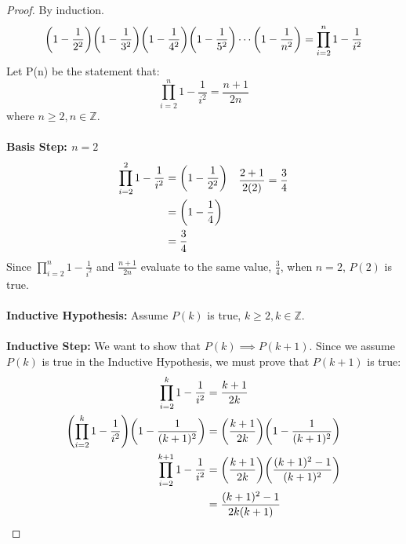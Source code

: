 \documentclass[article, 11pt]{article}
\DeclarePairedDelimiter\paren{(}{)} %
\newcommand{\df}{\displaystyle\frac} %
\newcommand{\ints}{\mathbb{Z}}
\begin{document}
\begin{proof} By induction. \\
    \[ \paren*{1-\df1{2^2}}\paren*{1-\df1{3^2}}\paren*{1-\df1{4^2}}\paren*{1-\df1{5^2}}\cdots \paren*{1-\df1{n^2}} = \prod_{i=2}^{n}{1 - \frac{1}{i^2}} \]
    Let P(n) be the statement that:
    \[ \prod_{i=2}^{n}{1 - \frac{1}{i^2}} = \frac{n+1}{2n}\]
    where $n \geq 2, n \in \ints$. \\
    \\
    \textbf{Basis Step: $n=2$}
    \begin{align*}
        \begin{aligned}
            \prod_{i=2}^{2}{1-\frac{1}{i^2}} &= \paren*{1 - \frac{1}{2^2}} \\
                                         &= \paren*{1 - \frac{1}{4}} \\
                                         &= \frac{3}{4}
        \end{aligned}
        &&
        \begin{aligned}
            \frac{2+1}{2(2)} &= \frac{3}{4} \\
            \\
            \\
            \\
        \end{aligned}
    \end{align*}
    Since $\displaystyle\prod_{i=2}^{n}{1-\frac{1}{i^2}}$ and $\df{n+1}{2n}$ evaluate to the same value, $\df{3}{4}$, when $n=2$, $P(2)$ is true. \\
    \\
    \textbf{Inductive Hypothesis:} Assume $P(k)$ is true, $k \geq 2, k \in \ints$. \\
    \\
    \textbf{Inductive Step:} We want to show that $P(k) \implies P(k+1)$. Since we assume $P(k)$ is true in the Inductive Hypothesis, we must prove that $P(k+1)$ is true: 
    \begin{align*}
        \prod_{i=2}^{k}{1-\frac{1}{i^2}} &= \frac{k+1}{2k} \\
        \paren*{\prod_{i=2}^{k}{1-\frac{1}{i^2}}}\paren*{1-\frac{1}{(k+1)^2}} &= \paren*{\frac{k+1}{2k}}\paren*{1-\frac{1}{(k+1)^2}} \\
        \prod_{i=2}^{k+1}{1-\frac{1}{i^2}} &= \paren*{\frac{k+1}{2k}}\paren*{\frac{(k+1)^2 - 1}{(k+1)^2}} \\
                                           &= \frac{(k+1)^2 - 1}{2k(k+1)} \\

\end{align*}
\end{proof}
\end{document}
